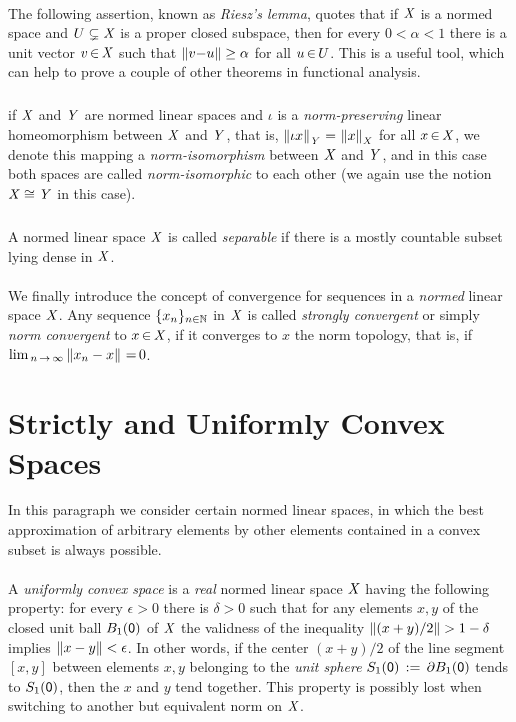 \documentclass[11pt,twoside]{article}
\begin{document}
\paragraph{} %
The following assertion,
known as \textit{Riesz's lemma},
quotes
that if $\mathit{X}$ is a normed space
and $U \subsetneq \mathit{X}$ is a proper closed subspace,
then for every $0 < \alpha < 1$ there is a unit vector $v {\,\in\,} \mathit{X}$
such that $\left\lVert v{-}u \right\rVert \geq \alpha$ for all $u {\,\in\,} U$.
This is a useful tool,
which can help to prove a couple of other theorems in functional analysis.

\subparagraph{} %
if $\mathit{X}$ and $\mathit{Y}$ are normed linear spaces
and $\iota$ is a \textit{norm-preserving} linear homeomorphism
between $\mathit{X}$ and $\mathit{Y}$,
that is,
$\left\lVert \iota x \right\rVert_{\mathit{Y}} {\,=\,} \left\lVert x \right\rVert_{\mathit{X}}$ for all $x {\,\in\,} \mathit{X}$,
we denote this mapping a \textit{norm-isomorphism} between $\mathit{X}$ and $\mathit{Y}$,
and in this case both spaces are called \textit{norm-isomorphic} to each other
(we again use the notion $\mathit{X} \cong \mathit{Y}$ in this case).

\subparagraph{} %
A normed linear space $\mathit{X}$ is called \textit{separable}
if there is a mostly countable subset lying dense in $\mathit{X}$.

\paragraph{} %
We finally introduce the concept of convergence
for sequences in a \textit{normed} linear space $\mathit{X}$.
Any sequence $\{x_n\}_{n \in {\mathbb{N}}}$ in $\mathit{X}$
is called \textit{strongly convergent}
or simply \textit{norm convergent} to $x {\,\in\,} \mathit{X}$,
if it converges to $x$ {\wrt} the norm topology,
that is,
if $\lim_{\,n {\,\to\,} \infty} \left\lVert x_n-x \right\rVert {\,=\,} 0$.

\section{Strictly and Uniformly Convex Spaces}
In this paragraph we consider certain normed linear spaces,
in which the best approximation of arbitrary elements
by other elements contained in a convex subset is always possible.

\paragraph{} %
A \textit{uniformly convex space} is a \textit{real} normed linear space $\mathit{X}$
having the following property:
for every $\epsilon > 0$ there is $\delta > 0$ 
such that
for any elements $x,y$ of the closed unit ball $B_1({\mathsf{0}})$ of $\mathit{X}$
the validness of the inequality $\left\lVert (x+y)/2 \right\rVert > 1- \delta$
implies $\left\lVert x-y \right\rVert < \epsilon$.
In other words,
if the center $(x+y)/2$ of the line segment $[x,y]$
between elements $x,y$ belonging to the \textit{unit sphere}
$S_1({\mathsf{0}}) \,:=\, \partial B_1({\mathsf{0}})$ tends to $S_1({\mathsf{0}})$,
then the $x$ and $y$ tend together.
This property is possibly lost
when switching to another but equivalent norm on $\mathit{X}$.
\end{document}
